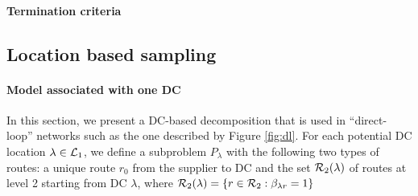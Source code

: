\documentclass[a4paper,10pt]{article}
\begin{document}
\begin{linenumbers}
\paragraph {Termination criteria}



\subsection{Location based sampling}


\paragraph{Model associated with one DC}

In this section, we present a DC-based decomposition that is used in ``direct-loop'' networks such as the one described by Figure \ref{fig:dl}. 
For each potential DC location $\lambda\in \mathcal{L}_1$, we define a subproblem $P_{\lambda}$ with the following 
two types of routes: 
a unique route $r_0$ from the supplier to DC
and the set $\mathcal{R}_2(\lambda)$ of routes at level 2 starting from DC $\lambda$, where 
$\mathcal{R}_2(\lambda)=\left\{r\in\mathcal{R}_2: \beta_{\lambda r}=1\right\}$ 
%


\end{linenumbers}
\end{document}
